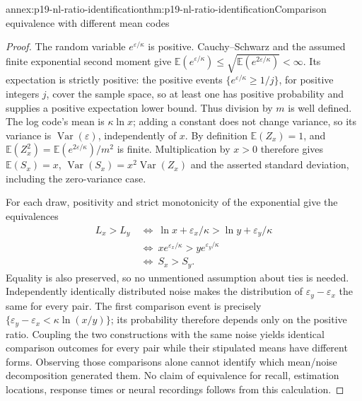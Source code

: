 \begin{annexitem}{annex:p19-nl-ratio-identification}{thm:p19-nl-ratio-identification}{Comparison equivalence with different mean codes}
\begin{proof}
The random variable \(e^{\varepsilon/\kappa}\) is positive.
Cauchy--Schwarz and the assumed finite exponential second moment
give
\(\mathbb E(e^{\varepsilon/\kappa})
 \leq\sqrt{\mathbb E(e^{2\varepsilon/\kappa})}<\infty\).
Its expectation is strictly positive: the positive events
\(\{e^{\varepsilon/\kappa}\geq1/j\}\), for positive integers
\(j\), cover the sample space, so at least one has positive
probability and supplies a positive expectation lower bound.
Thus division by \(m\) is well defined.
The log code's mean is \(\kappa\ln x\); adding a constant does
not change variance, so its variance is
\(\operatorname{Var}(\varepsilon)\), independently of \(x\).
By definition \(\mathbb E(Z_x)=1\), and
\(\mathbb E(Z_x^2)=\mathbb E(e^{2\varepsilon/\kappa})/m^2\)
is finite. Multiplication by \(x>0\) therefore gives
\(\mathbb E(S_x)=x\),
\(\operatorname{Var}(S_x)=x^2\operatorname{Var}(Z_x)\)
and the asserted standard deviation, including the zero-variance case.

For each draw, positivity and strict monotonicity of the exponential
give the equivalences
\[
 \begin{split}
 L_x>L_y
 &\ \Longleftrightarrow\
   \ln x+\varepsilon_x/\kappa>
     \ln y+\varepsilon_y/\kappa\\
 &\ \Longleftrightarrow\
   xe^{\varepsilon_x/\kappa}>ye^{\varepsilon_y/\kappa}\\
 &\ \Longleftrightarrow\ S_x>S_y.
 \end{split}
\]
Equality is also preserved, so no unmentioned assumption about
ties is needed. Independently identically distributed noise makes
the distribution of \(\varepsilon_y-\varepsilon_x\) the same
for every pair. The first comparison event is precisely
\(\{\varepsilon_y-\varepsilon_x<\kappa\ln(x/y)\}\);
its probability therefore depends only on the positive ratio.
Coupling the two constructions with the same noise yields identical
comparison outcomes for every pair while their stipulated means
have different forms. Observing those comparisons alone cannot
identify which mean/noise decomposition generated them.
No claim of equivalence for recall, estimation locations, response
times or neural recordings follows from this calculation.
\end{proof}
\end{annexitem}

